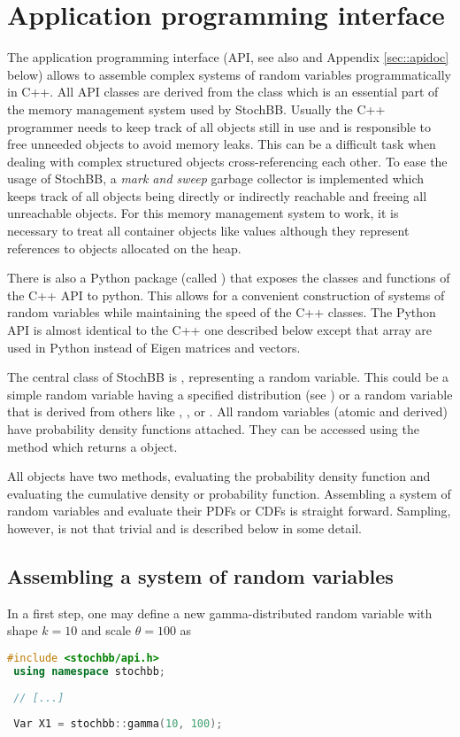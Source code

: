 \section{Application programming interface} \label{sec:api}
The application programming interface (API, see also \cite{stochbbapi} and Appendix 
\ref{sec::apidoc} below) allows to assemble complex systems of random variables programmatically in C++.
All API classes are derived from the  class which is an essential part of the
memory management system used by StochBB. Usually the C++ programmer needs to keep track of all
objects still in use and is responsible to free unneeded objects to avoid memory leaks. This can
be a difficult task when dealing with complex structured objects cross-referencing each other.
To ease the usage of StochBB, a \emph{mark and sweep} garbage collector is implemented which keeps track
of all objects being directly or indirectly reachable and freeing all unreachable objects. For
this memory management system to work, it is necessary to treat all container objects like values
although they represent references to objects allocated on the heap.

There is also a Python package (called ) that exposes the classes and functions 
of the C++ API to python. This allows for a convenient construction of systems of random variables
while maintaining the speed of the C++ classes. The Python API is almost identical to the C++ one
described below except that  array are used in Python instead of Eigen matrices and 
vectors.

The central class of StochBB is , representing a random variable. This could be a
simple random variable having a specified distribution (see ) or a random
variable that is derived from others like , ,  or
. All random variables (atomic and derived) have probability density functions
attached. They can be accessed using the  method which returns a 
 object.

All  objects have two methods,  evaluating the probability
density function and  evaluating the cumulative density or probability
function. Assembling a system of random variables and evaluate their PDFs or CDFs is straight
forward. Sampling, however, is not that trivial and is described below in some detail.

\subsection{Assembling a system of random variables}
In a first step, one may define a new gamma-distributed random variable with shape $k=10$
and scale $\theta=100$ as
\begin{lstlisting}[language=C++]
 #include <stochbb/api.h>
 using namespace stochbb;
 
 // [...]
 
 Var X1 = stochbb::gamma(10, 100);
\end{lstlisting}

